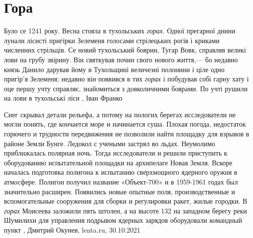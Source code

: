  
 
 
 
 
\chapter{Гора}
\label{sec:slova.gora}

Було се 1241 року. Весна стояла в тухольських \emph{горах}.  Одної прегарної
днини лунали лісисті пригірки Зелеменя голосами стрілецьких рогів і криками
численних стрільців.  Се новий тухольський боярин, Тугар Вовк, справляв великі
лови на грубу звірину. Він святкував почин свого нового життя,— бо недавно
князь Данило дарував йому в Тухольщині величезні полонини і ціле одно пригір'я
Зелеменя; недавно він появився в тих \emph{горах} і побудував собі гарну хату і
оце першу учту справляє, знайомиться з довколичними боярами. По учті рушили на
лови в тухольські ліси
, Іван Франко

Снег скрывал детали рельефа, а потому на пологих берегах исследователи не могли
понять, где кончается море и начинается суша. Плохая погода, недостаток
горючего и трудности передвижения не позволили найти площадку для взрывов в
районе Земли Бунге. Ледокол с учеными застрял во льдах. Неумолимо приближалась
полярная ночь.  Тогда исследователи и решили приступить к оборудованию
испытательной площадки на архипелаге Новая Земля. Вскоре началась подготовка
полигона к испытанию сверхмощного ядерного оружия в атмосфере. Полигон получил
название «Объект-700» и в 1959-1961 годах был значительно расширен. Появились
новые опытные поля, производственные и вспомогательные сооружения для сборки и
регулировки ракет, жилые городки.  В \emph{горах} Моисеева заложили пять штолен, а на
высоте 132 на западном берегу реки Шумилихи для управления подрывом ядерных
зарядов оборудовали командный пункт
, Дмитрий Окунев, lenta.ru, 30.10.2021
